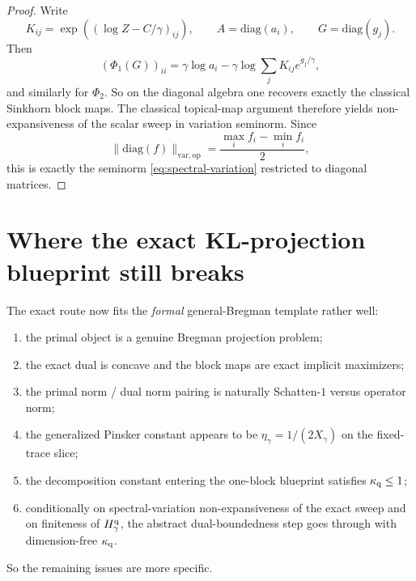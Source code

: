 \documentclass[11pt]{article}
\newcommand{\op}{\mathrm{op}}
\newcommand{\varop}{\mathrm{var},\op}
\theoremstyle{plain}
\begin{document}
\begin{proof}
Write
\[
K_{ij}=\exp((\log Z-C/\gamma)_{ij}),\qquad A=\mathrm{diag}(a_i),\qquad G=\mathrm{diag}(g_j).
\]
Then
\[
(\Phi_1(G))_{ii}
=
\gamma \log a_i
-\gamma \log \sum_j K_{ij} e^{g_j/\gamma},
\]
and similarly for $\Phi_2$.
So on the diagonal algebra one recovers exactly the classical Sinkhorn block maps.
The classical topical-map argument therefore yields non-expansiveness of the scalar sweep in variation seminorm.
Since
\[
\| \mathrm{diag}(f)\|_{\varop}
=
\frac{\max_i f_i-\min_i f_i}{2},
\]
this is exactly the seminorm \eqref{eq:spectral-variation} restricted to diagonal matrices.
\end{proof}

\section{Where the exact KL-projection blueprint still breaks}

The exact route now fits the \emph{formal} general-Bregman template rather well:
\begin{enumerate}[label=\textnormal{(\roman*)}]
\item the primal object is a genuine Bregman projection problem;
\item the exact dual is concave and the block maps are exact implicit maximizers;
\item the primal norm / dual norm pairing is naturally Schatten-$1$ versus operator norm;
\item the generalized Pinsker constant appears to be $\eta_\gamma=1/(2X_\gamma)$ on the fixed-trace slice;
\item the decomposition constant entering the one-block blueprint satisfies $\kappa_{\rm q}\le 1$;
\item conditionally on spectral-variation non-expansiveness of the exact sweep and on finiteness of $H_\gamma^{\rm q}$, the abstract dual-boundedness step goes through with dimension-free $\kappa_{\rm q}$.
\end{enumerate}
So the remaining issues are more specific.
\end{document}
